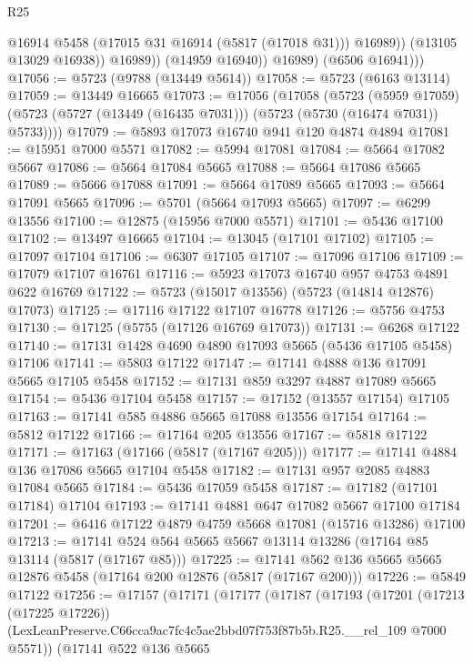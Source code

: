 \begin{lexlean}{R25}
\begin{coremodule}
                      @16914
                      @5458
                      (@17015 @31 @16914 (@5817 (@17018 @31)))
                      @16989))
                  (@13105 @13029 @16938))
                @16989))
            (@14959 @16940))
          @16989)
        (@6506 @16941)))
@17056 := @5723 (@9788 (@13449 @5614))
@17058 := @5723 (@6163 @13114)
@17059 := @13449 @16665
@17073 := @17056
    (@17058
      (@5723
        (@5959 @17059)
        (@5723 (@5727 (@13449 (@16435 @7031))) (@5723 (@5730 (@16474 @7031)) @5733))))
@17079 := @5893 @17073 @16740 @941 @120 @4874 @4894
@17081 := @15951 @7000 @5571
@17082 := @5994 @17081
@17084 := @5664 @17082 @5667
@17086 := @5664 @17084 @5665
@17088 := @5664 @17086 @5665
@17089 := @5666 @17088
@17091 := @5664 @17089 @5665
@17093 := @5664 @17091 @5665
@17096 := @5701 (@5664 @17093 @5665)
@17097 := @6299 @13556
@17100 := @12875 (@15956 @7000 @5571)
@17101 := @5436 @17100
@17102 := @13497 @16665
@17104 := @13045 (@17101 @17102)
@17105 := @17097 @17104
@17106 := @6307 @17105
@17107 := @17096 @17106
@17109 := @17079 @17107 @16761
@17116 := @5923 @17073 @16740 @957 @4753 @4891 @622 @16769
@17122 := @5723 (@15017 @13556) (@5723 (@14814 @12876) @17073)
@17125 := @17116 @17122 @17107 @16778
@17126 := @5756 @4753
@17130 := @17125 (@5755 (@17126 @16769 @17073))
@17131 := @6268 @17122
@17140 := @17131 @1428 @4690 @4890 @17093 @5665 (@5436 @17105 @5458) @17106
@17141 := @5803 @17122
@17147 := @17141 @4888 @136 @17091 @5665 @17105 @5458
@17152 := @17131 @859 @3297 @4887 @17089 @5665
@17154 := @5436 @17104 @5458
@17157 := @17152 (@13557 @17154) @17105
@17163 := @17141 @585 @4886 @5665 @17088 @13556 @17154
@17164 := @5812 @17122
@17166 := @17164 @205 @13556
@17167 := @5818 @17122
@17171 := @17163 (@17166 (@5817 (@17167 @205)))
@17177 := @17141 @4884 @136 @17086 @5665 @17104 @5458
@17182 := @17131 @957 @2085 @4883 @17084 @5665
@17184 := @5436 @17059 @5458
@17187 := @17182 (@17101 @17184) @17104
@17193 := @17141 @4881 @647 @17082 @5667 @17100 @17184
@17201 := @6416 @17122 @4879 @4759 @5668 @17081 (@15716 @13286) @17100
@17213 := @17141 @524 @564 @5665 @5667 @13114 @13286 (@17164 @85 @13114 (@5817 (@17167 @85)))
@17225 := @17141 @562 @136 @5665 @5665 @12876 @5458 (@17164 @200 @12876 (@5817 (@17167 @200)))
@17226 := @5849 @17122
@17256 := @17157
    (@17171
      (@17177
        (@17187
          (@17193
            (@17201
              (@17213 (@17225 @17226))
              (LexLeanPreserve.C66cca9ac7fc4c5ae2bbd07f753f87b5b.R25.__rel_109 @7000 @5571))
            (@17141
              @522
              @136
              @5665

\end{coremodule}
\end{lexlean}
